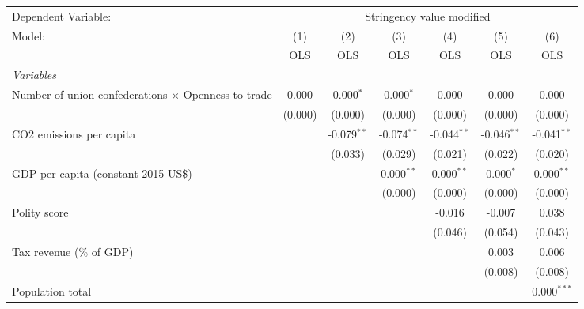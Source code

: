 
\begingroup
\centering
\begin{tabular}{lcccccc}
   \toprule
   Dependent Variable: & \multicolumn{6}{c}{Stringency value modified}\\
   Model:                                                     & (1)     & (2)           & (3)           & (4)           & (5)           & (6)\\  
                                                              &  OLS    & OLS           & OLS           & OLS           & OLS           & OLS\\  
   \midrule
   \emph{Variables}\\
   Number of union confederations $\times$ Openness to trade  & 0.000   & 0.000$^{*}$   & 0.000$^{*}$   & 0.000         & 0.000         & 0.000\\   
                                                              & (0.000) & (0.000)       & (0.000)       & (0.000)       & (0.000)       & (0.000)\\   
   CO2 emissions per capita                                   &         & -0.079$^{**}$ & -0.074$^{**}$ & -0.044$^{**}$ & -0.046$^{**}$ & -0.041$^{**}$\\   
                                                              &         & (0.033)       & (0.029)       & (0.021)       & (0.022)       & (0.020)\\   
   GDP per capita (constant 2015 US\$)                        &         &               & 0.000$^{**}$  & 0.000$^{**}$  & 0.000$^{*}$   & 0.000$^{**}$\\   
                                                              &         &               & (0.000)       & (0.000)       & (0.000)       & (0.000)\\   
   Polity score                                               &         &               &               & -0.016        & -0.007        & 0.038\\   
                                                              &         &               &               & (0.046)       & (0.054)       & (0.043)\\   
   Tax revenue (\% of GDP)                                    &         &               &               &               & 0.003         & 0.006\\   
                                                              &         &               &               &               & (0.008)       & (0.008)\\   
   Population total                                           &         &               &               &               &               & 0.000$^{***}$\\   

\end{tabular}
